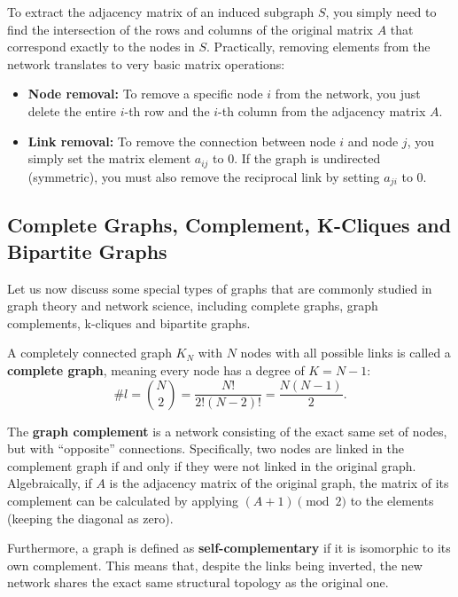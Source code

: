To extract the adjacency matrix of an induced subgraph $S$, you simply need to find the intersection of the rows and columns of the original matrix $A$ that correspond exactly to the nodes in $S$. Practically, removing elements from the network translates to very basic matrix operations:
\begin{itemize}
    \item \textbf{Node removal:} To remove a specific node $i$ from the network, you just delete the entire $i$-th row and the $i$-th column from the adjacency matrix $A$.
    \item \textbf{Link removal:} To remove the connection between node $i$ and node $j$, you simply set the matrix element $a_{ij}$ to $0$. If the graph is undirected (symmetric), you must also remove the reciprocal link by setting $a_{ji}$ to $0$.
\end{itemize}

\subsection{Complete Graphs, Complement, K-Cliques and Bipartite Graphs}

Let us now discuss some special types of graphs that are commonly studied in graph theory and network science, including complete graphs, graph complements, k-cliques and bipartite graphs.

\begin{definition}
    A completely connected graph $K_N$ with $N$ nodes with all possible links is called a \textbf{complete graph}, meaning every node has a degree of $K = N-1$:
    $$\# l = \binom{N}{2} = \frac{N!}{2!(N-2)!} = \frac{N(N-1)}{2}.$$
\end{definition}

\begin{definition}
    The \textbf{graph complement} is a network consisting of the exact same set of nodes, but with ``opposite'' connections. Specifically, two nodes are linked in the complement graph if and only if they were not linked in the original graph. Algebraically, if $A$ is the adjacency matrix of the original graph, the matrix of its complement can be calculated by applying $(A + 1) \pmod{2}$ to the elements (keeping the diagonal as zero).

    Furthermore, a graph is defined as \textbf{self-complementary} if it is isomorphic to its own complement. This means that, despite the links being inverted, the new network shares the exact same structural topology as the original one.
\end{definition}

